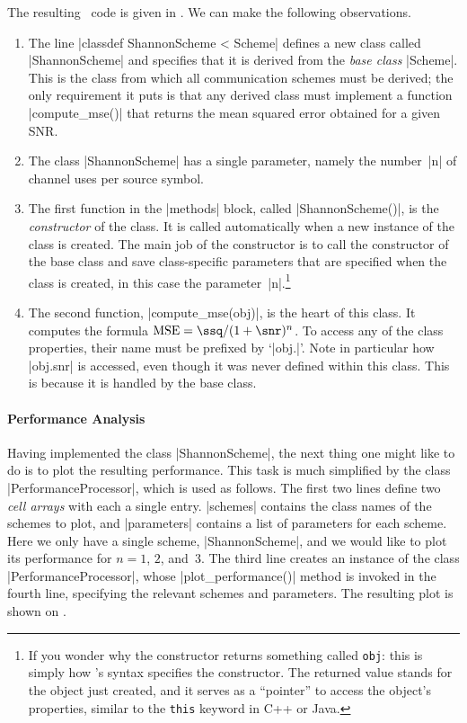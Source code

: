 The resulting \matlab\ code is given in . We can make the
following observations.
\begin{enumerate}
  \item The line |classdef ShannonScheme < Scheme| defines a new class
    called |ShannonScheme| and specifies that it is derived from the
    \emph{base class} |Scheme|. This is the class from which all communication
    schemes must be derived; the only requirement it puts is that any derived
    class must implement a function |compute_mse()| that returns the mean
    squared error obtained for a given SNR.

  \item The class |ShannonScheme| has a single parameter, namely the number~|n|
    of channel uses per source symbol.

  \item The first function in the |methods| block, called |ShannonScheme()|, is
    the \emph{constructor} of the class. It is called automatically when a new
    instance of the class is created. The main job of the constructor is to call
    the constructor of the base class and save class-specific parameters that
    are specified when the class is created, in this case the
    parameter~|n|.\footnote{If you wonder why the constructor returns something
    called \Verb+obj+: this is simply how \matlab's syntax specifies the
    constructor.  The returned value stands for the object just created, and it
    serves as a ``pointer'' to access the object's properties, similar to the
    \Verb+this+ keyword in C++ or Java.}

  \item The second function, |compute_mse(obj)|, is the heart of this class. It
    computes the formula $\text{MSE} = \ssq / (1 + \snr)^n$. To access any of
    the class properties, their name must be prefixed by `|obj.|'.
    Note in particular how |obj.snr| is accessed, even though it was never
    defined within this class. This is because it is handled by the base class. 
\end{enumerate}


\paragraph{Performance Analysis}
Having implemented the class |ShannonScheme|, the next thing one might like to
do is to plot the resulting performance. This task is much simplified by the
class |PerformanceProcessor|, which is used as follows.
The first two lines define two \emph{cell arrays} with each a single entry.
|schemes| contains the class names of the schemes to plot, and |parameters|
contains a list of parameters for each scheme. Here we only have a single
scheme, |ShannonScheme|, and we would like to plot its performance for $n = 1$,
$2$, and~$3$. The third line creates an instance of the class
|PerformanceProcessor|, whose |plot_performance()| method is invoked in the
fourth line, specifying the relevant schemes and parameters. The resulting plot
is shown on .

